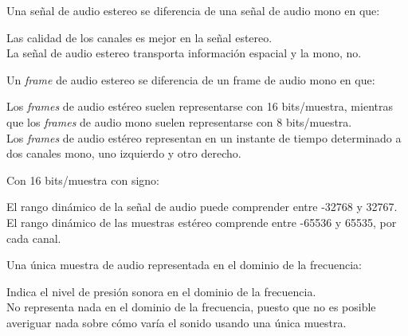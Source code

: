 \documentclass[legalpaper, 12pt, addpoints]{exam}
\begin{document}
\begin{questions}
\vspace{0.10in}

\question Una señal de audio estereo se diferencia de una señal de audio mono en que:

\begin{oneparchoices}
  \choice Las calidad de los canales es mejor en la señal estereo.\\
  \choice La señal de audio estereo transporta información espacial y la mono, no.
\end{oneparchoices}
  
\vspace{0.10in}

\question Un \emph{frame} de audio estereo se diferencia de un frame de audio mono en que:

\begin{oneparchoices}
  \choice Los \emph{frames} de audio estéreo suelen representarse con
  16 bits/muestra,
  mientras que los \emph{frames} de audio mono suelen representarse con 8 bits/muestra.\\
  \choice Los \emph{frames} de audio estéreo representan en un
  instante de tiempo determinado a dos canales mono, uno izquierdo y
  otro derecho.
\end{oneparchoices}
  
\vspace{0.10in}

\question Con 16 bits/muestra con signo:

\begin{oneparchoices}
  \choice El rango dinámico de la señal de audio puede comprender entre -32768 y 32767.\\
  \choice El rango dinámico de las muestras estéreo comprende entre -65536 y 65535, por cada canal.
\end{oneparchoices}
  
\vspace{0.10in}

\question Una única muestra de audio representada en el dominio de la frecuencia:

\begin{oneparchoices}
  \choice Indica el nivel de presión sonora en el dominio de la frecuencia.\\
  \choice No representa nada en el dominio de la frecuencia, puesto
  que no es posible averiguar nada sobre cómo varía el sonido usando
  una única muestra.
\end{oneparchoices}
  
\vspace{0.10in}


\end{questions}
\end{document}
